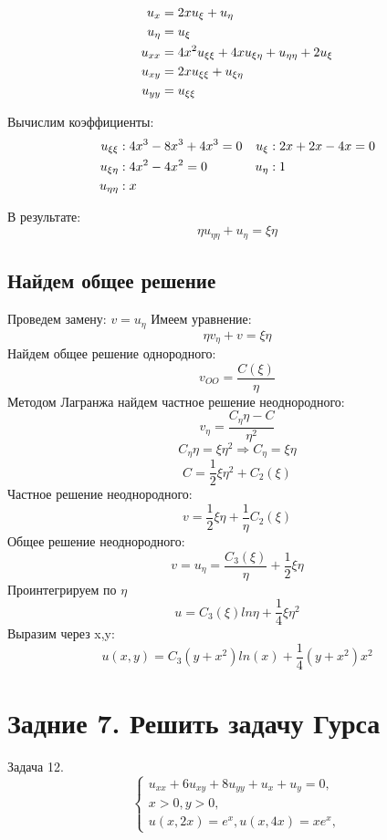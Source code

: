 \documentclass[a4paper,12pt]{article}
\begin{document}
    \begin{align}
        u_x &= 2xu_\xi + u_\eta \notag \\
        u_\eta &= u_\xi \notag \\
        u_{xx} &= 4x^2u_{\xi\xi} + 4xu_{\xi\eta} + u_{\eta\eta} + 2u_\xi \notag \\
        u_{xy} &= 2xu_{\xi\xi} + u_{\xi\eta} \notag \\
        u_{yy} &= u_{\xi\xi} \notag
    \end{align}

    Вычислим коэффициенты:
    \begin{align}
    u_{\xi\xi} &: 4x^3 - 8x^3 + 4x^3 = 0 &u_\xi &: 2x+2x-4x = 0 \notag \\
    u_{\xi\eta} &: 4x^2 - 4x^2 = 0 &u_\eta &: 1 \notag \\
    u_{\eta\eta} &: x \notag
    \end{align}

    В результате:
    $$\eta u_{\eta\eta} + u_\eta = \xi\eta$$

    \subsection{Найдем общее решение}
    Проведем замену: $v = u_\eta$
    Имеем уравнение:
    $$\eta v_\eta + v = \xi\eta$$
    Найдем общее решение однородного:
    $$v_{OO} = \frac{C(\xi)}{\eta}$$
    Методом Лагранжа найдем частное решение неоднородного:
    $$v_\eta = \frac{C_\eta\eta - C}{\eta^2}$$
    $$C_\eta\eta = \xi\eta^2 \Rightarrow C_\eta = \xi\eta$$
    $$C = \frac{1}{2} \xi\eta^2 + C_2(\xi)$$
    Частное решение неоднородного:
    $$v = \frac{1}{2}\xi\eta + \frac{1}{\eta}C_2(\xi)$$
    Общее решение неоднородного:
    $$v = u_\eta = \frac{C_3(\xi)}{\eta} + \frac{1}{2}\xi\eta$$
    Проинтегрируем по $\eta$
    $$u = C_3(\xi)ln\eta + \frac{1}{4}\xi\eta^2$$
    Выразим через x,y:
    $$u(x,y) = C_3(y+x^2)ln(x) + \frac{1}{4}(y+x^2)x^2$$

\section{Задние 7. Решить задачу Гурса}
    Задача 12.
    \begin{equation*}
        \begin{cases}
            u_{xx} + 6u_{xy} + 8u_{yy} + u_x + u_y = 0,
            \\
            x > 0, y>0,
            \\
            u(x,2x) = e^x, u(x, 4x) = xe^x,
        \end{cases}
    \end{equation*}
\end{document}
